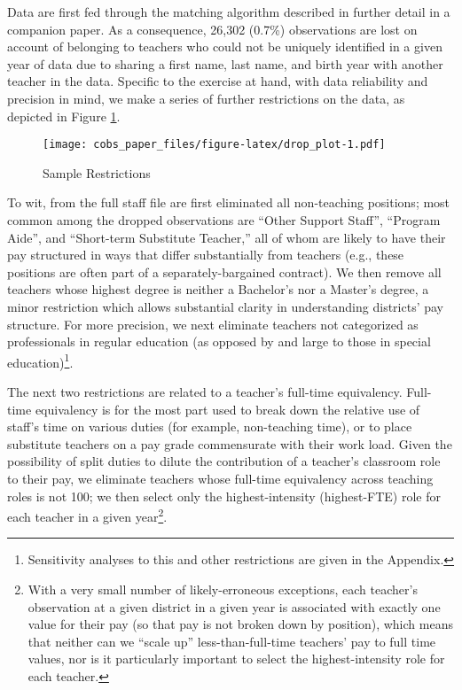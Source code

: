 \documentclass[]{article}
\let\rmarkdownfootnote\footnote%
\def\footnote{\protect\rmarkdownfootnote}
\begin{document}
Data are first fed through the matching algorithm described in further
detail in a companion paper. As a consequence, 26,302 (0.7\%)
observations are lost on account of belonging to teachers who could not
be uniquely identified in a given year of data due to sharing a first
name, last name, and birth year with another teacher in the data.
Specific to the exercise at hand, with data reliability and precision in
mind, we make a series of further restrictions on the data, as depicted
in Figure \ref{fig:samp_res}.

\begin{figure}[htbp]
\centering
\texttt{[image: cobs\_paper\_files/figure-latex/drop\_plot-1.pdf]}
\caption{\label{fig:samp_res}Sample Restrictions}
\end{figure}

To wit, from the full staff file are first eliminated all non-teaching
positions; most common among the dropped observations are ``Other
Support Staff'', ``Program Aide'', and ``Short-term Substitute
Teacher,'' all of whom are likely to have their pay structured in ways
that differ substantially from teachers (e.g., these positions are often
part of a separately-bargained contract). We then remove all teachers
whose highest degree is neither a Bachelor's nor a Master's degree, a
minor restriction which allows substantial clarity in understanding
districts' pay structure. For more precision, we next eliminate teachers
not categorized as professionals in regular education (as opposed by and
large to those in special education)\footnote{Sensitivity analyses to
  this and other restrictions are given in the Appendix.}.

The next two restrictions are related to a teacher's full-time
equivalency. Full-time equivalency is for the most part used to break
down the relative use of staff's time on various duties (for example,
non-teaching time), or to place substitute teachers on a pay grade
commensurate with their work load. Given the possibility of split duties
to dilute the contribution of a teacher's classroom role to their pay,
we eliminate teachers whose full-time equivalency across teaching roles
is not 100; we then select only the highest-intensity (highest-FTE) role
for each teacher in a given year\footnote{With a very small number of
  likely-erroneous exceptions, each teacher's observation at a given
  district in a given year is associated with exactly one value for
  their pay (so that pay is not broken down by position), which means
  that neither can we ``scale up'' less-than-full-time teachers' pay to
  full time values, nor is it particularly important to select the
  highest-intensity role for each teacher.}.
\end{document}
